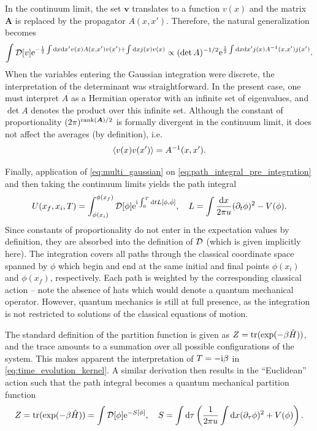 In the continuum limit, the set $\bm v$ translates to a function $v(x)$ and the matrix $\bm A$ is replaced by the propagator $A(x,x')$.
Therefore, the natural generalization becomes
\begin{align}
    \int\mathcal D[v]\mathrm e^{-\frac12\int\mathrm d x\mathrm d x' v(x)A(x,x')v(x')+\int\mathrm d x j(x) v(x)}
    \propto
    (\det A)^{-1/2}\mathrm e^{\frac12\int\mathrm d x\mathrm d x' j(x) A^{-1}(x,x')j(x')}.
    \label{eq:field_source}
\end{align}
When the variables entering the Gaussian integration were discrete, the interpretation of the determinant was straightforward.
In the present case, one must interpret $A$ as a Hermitian operator with an infinite set of eigenvalues, and $\det A$ denotes the product over this infinite set.
Although the constant of proportionality $(2\pi)^{{\rm rank}(\bm A)/2}$ is formally divergent in the continuum limit, it does not affect the averages (by definition), i.e.
\begin{align}
    \braket{v(x)v(x')} = A^{-1}(x,x').
\end{align}

Finally, application of \cref{eq:multi_gaussian} on \cref{eq:path_integral_pre_integration} and then taking the continuum limits yields the path integral
\begin{align}
    U(x_f,x_i,T)
    =
    \int_{\phi(x_i)}^{\phi(x_f)}{\mathcal D[\phi]}
    \mathrm e^{\mathrm i\int_0^T\mathrm d tL[\phi,\dot\phi]}
    ,\quad
    L = \int\frac{\mathrm d x}{2\pi u}(\partial_t\phi)^2 - V(\phi).
    \label{eq:time_evolution_kernel_path_integral}
\end{align}
Since constants of proportionality do not enter in the expectation values by definition, they are absorbed into the definition of $\mathcal D$ (which is given implicitly here).
The integration covers all paths through the classical coordinate space spanned by $\phi$ which begin and end at the same initial and final points $\phi(x_i)$ and $\phi(x_f)$, respectively.
Each path is weighted by the corresponding classical action -- note the absence of hats which would denote a quantum mechanical operator.
However, quantum mechanics is still at full presence, as the integration is not restricted to solutions of the classical equations of motion.

The standard definition of the partition function is given as $Z={\rm tr}(\exp(-\beta \hat H))$, and the trace amounts to a summation over all possible configurations of the system.
This makes apparent the interpretation of $T=-\mathrm i \beta$ in \cref{eq:time_evolution_kernel}.
A similar derivation then results in the ``Euclidean'' action such that the path integral becomes a quantum mechanical partition function
\begin{align}
    Z = {\rm tr}(\exp(-\beta \hat H)) = \int\mathcal D[\phi]\mathrm e^{-S[\phi]}
    ,\quad
    S = \int\mathrm d\tau\left( \frac1{2\pi u}\int\mathrm d x(\partial_\tau\phi)^2+V(\phi) \right).
\end{align}

